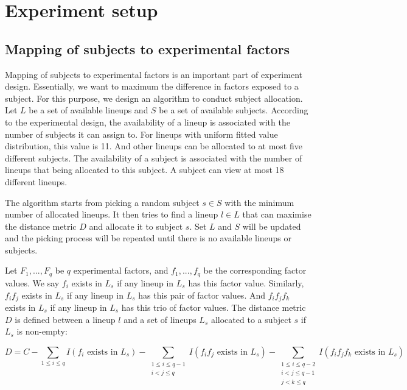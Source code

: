\documentclass[]{interact}
\theoremstyle{plain}%
\theoremstyle{definition}
\theoremstyle{remark}
\begin{document}
\newpage

\hypertarget{experiment-setup}{%
\section{Experiment setup}\label{experiment-setup}}

\hypertarget{mapping-of-subjects-to-experimental-factors}{%
\subsection{Mapping of subjects to experimental
factors}\label{mapping-of-subjects-to-experimental-factors}}

Mapping of subjects to experimental factors is an important part of
experiment design. Essentially, we want to maximum the difference in
factors exposed to a subject. For this purpose, we design an algorithm
to conduct subject allocation. Let \(L\) be a set of available lineups
and \(S\) be a set of available subjects. According to the experimental
design, the availability of a lineup is associated with the number of
subjects it can assign to. For lineups with uniform fitted value
distribution, this value is 11. And other lineups can be allocated to at
most five different subjects. The availability of a subject is
associated with the number of lineups that being allocated to this
subject. A subject can view at most 18 different lineups.

The algorithm starts from picking a random subject \(s \in S\) with the
minimum number of allocated lineups. It then tries to find a lineup
\(l \in L\) that can maximise the distance metric \(D\) and allocate it
to subject \(s\). Set \(L\) and \(S\) will be updated and the picking
process will be repeated until there is no available lineups or
subjects.

Let \(F_1,...,F_q\) be \(q\) experimental factors, and \(f_1, ...,f_q\)
be the corresponding factor values. We say \(f_i\) exists in \(L_{s}\)
if any lineup in \(L_{s}\) has this factor value. Similarly, \(f_if_j\)
exists in \(L_{s}\) if any lineup in \(L_{s}\) has this pair of factor
values. And \(f_if_jf_k\) exists in \(L_{s}\) if any lineup in \(L_{s}\)
has this trio of factor values. The distance metric \(D\) is defined
between a lineup \(l\) and a set of lineups \(L_{s}\) allocated to a
subject \(s\) if \(L_{s}\) is non-empty:

\footnotesize

\begin{equation*}
D =
C - \sum_{1\leq i \leq q}I(f_i\text{ exists in }L_{s}) - \sum_{\substack{1\leq i \leq q-1 \\ i < j \leq q}}I(f_if_j\text{ exists in }L_{s}) - \sum_{\substack{1\leq i \leq q - 2 \\ i < j \leq q - 1 \\ j < k \leq q}}I(f_if_jf_k\text{ exists in }L_{s})
\end{equation*}
\end{document}
